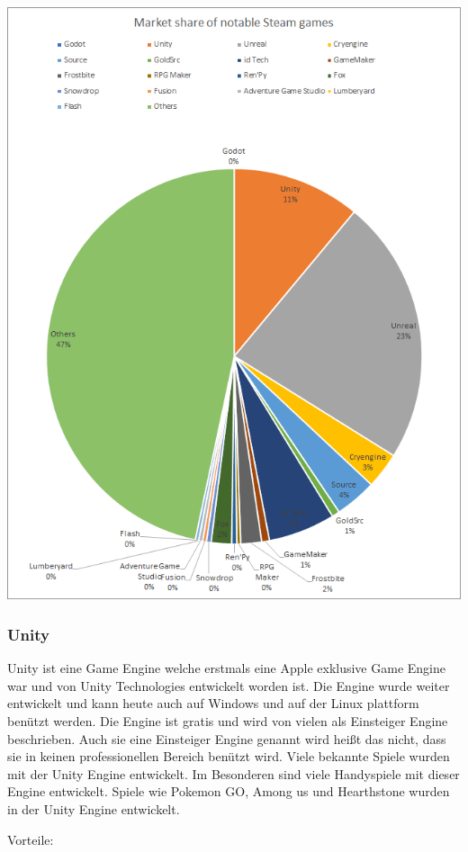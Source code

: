 \includegraphics[scale=0.5]{pics/game_engine_marketshare}

\subsubsection{Unity}

Unity ist eine Game Engine welche erstmals eine Apple exklusive Game Engine war und von Unity Technologies entwickelt worden ist.
Die Engine wurde weiter entwickelt und kann heute auch auf Windows und auf der Linux plattform benützt werden.
Die Engine ist gratis und wird von vielen als Einsteiger Engine beschrieben.
Auch sie eine Einsteiger Engine genannt wird heißt das nicht, dass sie in keinen professionellen Bereich benützt wird.
Viele bekannte Spiele wurden mit der Unity Engine entwickelt.
Im Besonderen sind viele Handyspiele mit dieser Engine entwickelt.
Spiele wie Pokemon GO, Among us und Hearthstone wurden in der Unity Engine entwickelt.

Vorteile:

